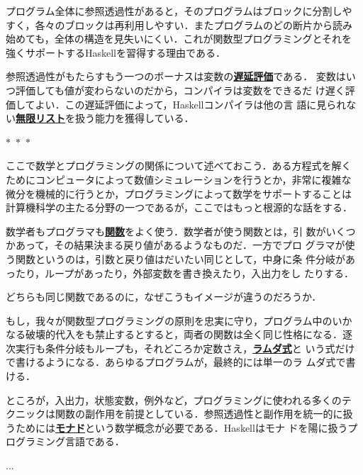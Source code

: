 \documentclass[a5paper,twoside,fleqn,draft]{jsbook}
\newcommand{\separator}{\begin{center}$*$~$*$~$*$\end{center}}
\newcommand{\programminglanguage}[1]{\textsf{#1}}
\newcommand{\haskell}{\programminglanguage{Haskell}}
\newcommand{\keyword}[1]{{\underline{\textbf{#1}}}}
\begin{document}
プログラム全体に参照透過性があると，そのプログラムはブロックに分割しや
すく，各々のブロックは再利用しやすい．またプログラムのどの断片から読み
始めても，全体の構造を見失いにくい．これが関数型プログラミングとそれを
強くサポートする\haskell を習得する理由である．

参照透過性がもたらすもう一つのボーナスは変数の\keyword{遅延評価}である．
変数はいつ評価しても値が変わらないのだから，コンパイラは変数をできるだ
け遅く評価してよい．この遅延評価によって，\haskell コンパイラは他の言
語に見られない\keyword{無限リスト}を扱う能力を獲得している．

\separator

ここで数学とプログラミングの関係について述べておこう．ある方程式を解く
ためにコンピュータによって数値シミュレーションを行うとか，非常に複雑な
微分を機械的に行うとか，プログラミングによって数学をサポートすることは
計算機科学の主たる分野の一つであるが，ここではもっと根源的な話をする．

数学者もプログラマも\keyword{関数}をよく使う．数学者が使う関数とは，引
数がいくつかあって，その結果決まる戻り値があるようなものだ．一方でプロ
グラマが使う関数というのは，引数と戻り値はだいたい同じとして，中身に条
件分岐があったり，ループがあったり，外部変数を書き換えたり，入出力をし
たりする．

どちらも同じ関数であるのに，なぜこうもイメージが違うのだろうか．

もし，我々が関数型プログラミングの原則を忠実に守り，プログラム中のいか
なる破壊的代入をも禁止するとすると，両者の関数は全く同じ性格になる．逐
次実行も条件分岐もループも，それどころか定数さえ，\keyword{ラムダ式}と
いう式だけで書けるようになる．あらゆるプログラムが，最終的には単一のラ
ムダ式で書ける．

ところが，入出力，状態変数，例外など，プログラミングに使われる多くのテ
クニックは関数の副作用を前提としている．参照透過性と副作用を統一的に扱
うためには\keyword{モナド}という数学概念が必要である．\haskell はモナ
ドを陽に扱うプログラミング言語である．

... %




\end{document}

